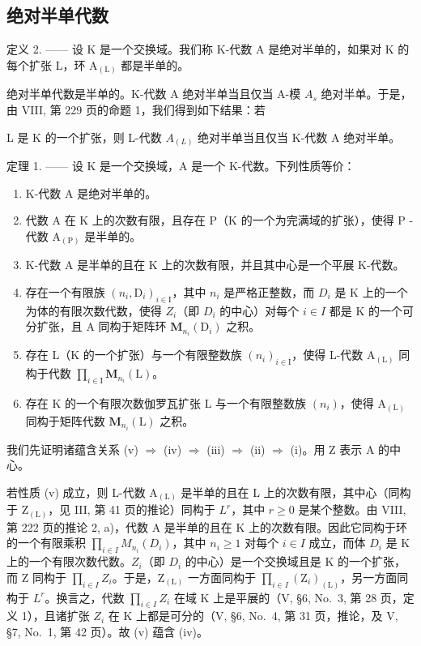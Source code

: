 \subsection{绝对半单代数}

定义 2. —— 设 K 是一个交换域。我们称 K-代数 A 是绝对半单的，如果对 K 的每个扩张 L，环 \(\mathrm{A}_{(\mathrm{L})}\) 都是半单的。

绝对半单代数是半单的。K-代数 A 绝对半单当且仅当 A-模 \(A_{s}\) 绝对半单。于是，由 VIII, 第 229 页的命题 1，我们得到如下结果：若

L 是 K 的一个扩张，则 L-代数 \(A_{(L)}\) 绝对半单当且仅当 K-代数 A 绝对半单。

定理 1. —— 设 K 是一个交换域，A 是一个 K-代数。下列性质等价：

\begin{enumerate}
\def\labelenumi{(\roman{enumi})}
\item
  K-代数 A 是绝对半单的。
\item
  代数 \(\mathrm{A}\) 在 \(\mathrm{K}\) 上的次数有限，且存在 \(\mathrm{P}\)（\(\mathrm{K}\) 的一个为完满域的扩张），使得 \(\mathrm{P}\) -代数 \(\mathrm{A}_{(\mathrm{P})}\) 是半单的。
\item
  K-代数 A 是半单的且在 K 上的次数有限，并且其中心是一个平展 K-代数。
\item
  存在一个有限族 \((n_{i},\mathrm{D}_{i})_{i\in\mathrm{I}}\)，其中 \(n_{i}\) 是严格正整数，而 \(D_{i}\) 是 K 上的一个为体的有限次数代数，使得 \(Z_{i}\)（即 \(D_{i}\) 的中心）对每个 \(i\in I\) 都是 K 的一个可分扩张，且 A 同构于矩阵环 \(\mathbf{M}_{n_{i}}(\mathrm{D}_{i})\) 之积。
\item
  存在 \(\mathrm{L}\)（\(\mathrm{K}\) 的一个扩张）与一个有限整数族 \((n_i)_{i\in \mathrm{I}}\)，使得 L-代数 \(\mathrm{A}_{(\mathrm{L})}\) 同构于代数 \(\prod_{i\in \mathrm{I}}\mathbf{M}_{n_i}(\mathrm{L})\)。
\item
  存在 K 的一个有限次数伽罗瓦扩张 L 与一个有限整数族 \((n_{i})\)，使得 \(\mathrm{A}_{(\mathrm{L})}\) 同构于矩阵代数 \(\mathbf{M}_{n_{i}}(\mathrm{L})\) 之积。
\end{enumerate}

我们先证明诸蕴含关系 (v) \(\Rightarrow\) (iv) \(\Rightarrow\) (iii) \(\Rightarrow\) (ii) \(\Rightarrow\) (i)。用 Z 表示 A 的中心。

若性质 (v) 成立，则 L-代数 \(\mathrm{A}_{(\mathrm{L})}\) 是半单的且在 L 上的次数有限，其中心（同构于 \(\mathrm{Z}_{(\mathrm{L})}\)，见 III, 第 41 页的推论）同构于 \(L^{r}\)，其中 \(r \geqslant 0\) 是某个整数。由 VIII, 第 222 页的推论 2, a)，代数 A 是半单的且在 K 上的次数有限。因此它同构于环的一个有限乘积 \(\prod_{i \in I} M_{n_{i}}(D_{i})\)，其中 \(n_{i} \geqslant 1\) 对每个 \(i \in I\) 成立，而体 \(D_{i}\) 是 K 上的一个有限次数代数。\(Z_{i}\)（即 \(D_{i}\) 的中心）是一个交换域且是 K 的一个扩张，而 Z 同构于 \(\prod_{i \in I} Z_{i}\)。于是，\(\mathrm{Z}_{(\mathrm{L})}\) 一方面同构于 \(\prod_{i \in I} (\mathrm{Z}_{i})_{(\mathrm{L})}\)，另一方面同构于 \(L^{r}\)。换言之，代数 \(\prod_{i \in I} Z_{i}\) 在域 K 上是平展的（V, §6, No.~3, 第 28 页，定义 1），且诸扩张 \(Z_{i}\) 在 K 上都是可分的（V, §6, No.~4, 第 31 页，推论，及 V, §7, No.~1, 第 42 页）。故 (v) 蕴含 (iv)。

